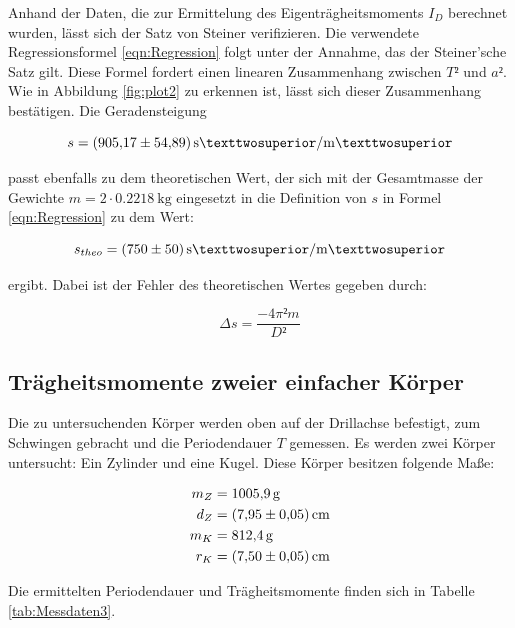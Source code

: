 Anhand der Daten, die zur Ermittelung des Eigenträgheitsmoments $I_D$ berechnet wurden, lässt sich der
Satz von Steiner verifizieren. Die verwendete Regressionsformel \eqref{eqn:Regression} folgt unter der
Annahme, das der Steiner'sche Satz gilt. Diese Formel fordert einen linearen Zusammenhang zwischen 
$T²$ und $a²$. Wie in Abbildung \ref{fig:plot2} zu erkennen ist, lässt sich dieser Zusammenhang 
bestätigen. Die Geradensteigung

\begin{equation*}
s = \SI{905.17+-54.89}{\second²\per\meter²}
\end{equation*}

passt ebenfalls zu dem theoretischen Wert, der sich mit der Gesamtmasse der Gewichte  $m = 2\cdot 
\SI{0.2218}{\kilo\gram}$ eingesetzt in die Definition von $s$ in Formel \eqref{eqn:Regression} zu 
dem Wert:

\begin{equation*}
s_{theo} = \SI{750+-50}{\second²\per\meter²}
\end{equation*}

ergibt.
Dabei ist der Fehler des theoretischen Wertes gegeben durch:

\begin{equation*}
\Delta s = \frac{-4\pi²m}{D²} 
\end{equation*}

\subsection{Trägheitsmomente zweier einfacher Körper}

Die zu untersuchenden Körper werden oben auf der Drillachse befestigt, zum Schwingen gebracht 
und die Periodendauer $T$ gemessen. Es werden zwei Körper untersucht: Ein Zylinder und eine Kugel.
Diese Körper besitzen folgende Maße: 

\begin{align*}
m_Z &= \SI{1005.9}{\gram}\\
d_Z &= \SI{7.95+-0.05}{\centi\meter}\\
m_K &= \SI{812.4}{\gram}\\
r_K &= \SI{7.5+-0.05}{\centi\meter} 
\end{align*}

Die ermittelten Periodendauer und Trägheitsmomente finden sich in Tabelle \ref{tab:Messdaten3}.

